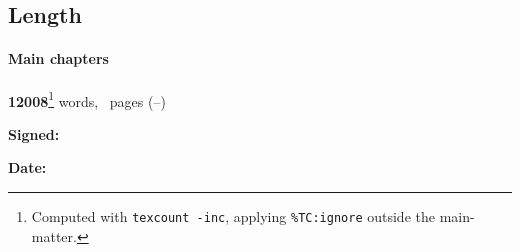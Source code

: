 \ifanonymised
\subsection*{Length}

\paragraph{Main chapters} 
\textbf{\color{red} 12008}\footnote{Computed with \texttt{texcount -inc}, applying \texttt{\%TC:ignore} outside the main-matter.} words, \textbf{\contentpages}~pages
(\pageref{firstcontentpage}--\pageref{lastcontentpage})

\fi

\vfill

\textbf{Signed:} 
\ifanonymised
\candidate
\else
\authorself{}
\fi

\vspace{0.5cm}
\textbf{Date:} \submissiondate{}
\vspace{3cm}

\endgroup
